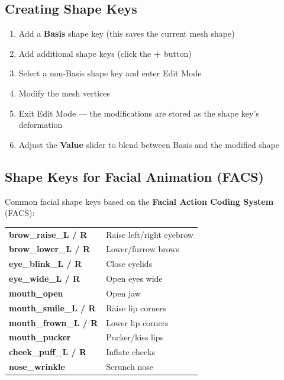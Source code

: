 \subsection{Creating Shape Keys}

\begin{enumerate}[leftmargin=2em]
  \item Add a \textbf{Basis} shape key (this saves the current mesh shape)
  \item Add additional shape keys (click the \textbf{+} button)
  \item Select a non-Basis shape key and enter Edit Mode
  \item Modify the mesh vertices
  \item Exit Edit Mode --- the modifications are stored as the shape key's deformation
  \item Adjust the \textbf{Value} slider to blend between Basis and the modified shape
\end{enumerate}

\subsection{Shape Keys for Facial Animation (FACS)}
\label{subsec:facs}

Common facial shape keys based on the \textbf{Facial Action Coding System} (FACS):

\begin{center}
\begin{tabularx}{\textwidth}{L{4cm}X}
\toprule
{}
 &  \\
\midrule
\textbf{brow\_raise\_L / R} & Raise left/right eyebrow \\
\textbf{brow\_lower\_L / R} & Lower/furrow brows \\
\textbf{eye\_blink\_L / R} & Close eyelids \\
\textbf{eye\_wide\_L / R} & Open eyes wide \\
\textbf{mouth\_open} & Open jaw \\
\textbf{mouth\_smile\_L / R} & Raise lip corners \\
\textbf{mouth\_frown\_L / R} & Lower lip corners \\
\textbf{mouth\_pucker} & Pucker/kiss lips \\
\textbf{cheek\_puff\_L / R} & Inflate cheeks \\
\textbf{nose\_wrinkle} & Scrunch nose \\
\bottomrule
\end{tabularx}
\end{center}

